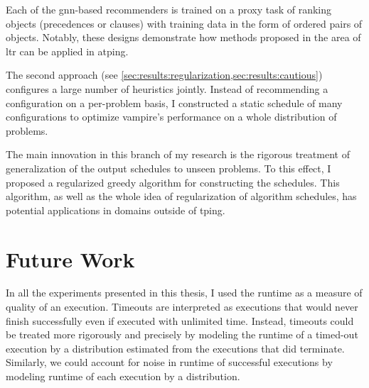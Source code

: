 Each of the \acrshort{gnn}-based recommenders is trained on a proxy task of ranking objects (precedences or clauses)
with training data in the form of ordered pairs of objects.
Notably, these designs demonstrate how methods proposed in the area of \acrlong{ltr}
can be applied in \gls{atping}.

The second approach (see \cref{sec:results:regularization,sec:results:cautious}) configures a large number of heuristics jointly.
Instead of recommending a configuration on a per-problem basis,
I constructed a static schedule of many configurations to optimize \gls{vampire}'s performance on a whole distribution of problems.

The main innovation in this branch of my research is the rigorous treatment of generalization of the output schedules to unseen problems.
To this effect, I proposed a regularized greedy algorithm for constructing the schedules.
This algorithm, as well as the whole idea of regularization of algorithm schedules, has potential applications in domains outside of \gls{tping}.


\section{Future Work}



In all the experiments presented in this thesis, I used the runtime as a measure of quality of an execution.
Timeouts are interpreted as executions that would never finish successfully even if executed with unlimited time.
Instead, timeouts could be treated more rigorously and precisely by modeling the runtime of a timed-out execution by a distribution estimated from the executions that did terminate.
Similarly, we could account for noise in runtime of successful executions by modeling runtime of each execution by a distribution.


